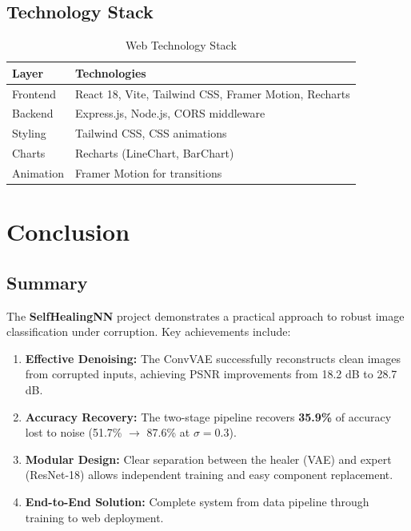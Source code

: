 \documentclass[11pt,a4paper]{article}
\begin{document}
\subsection{Technology Stack}

\begin{table}[H]
    \centering
    \caption{Web Technology Stack}
    \label{tab:web-tech}
    \begin{tabular}{ll}
        \toprule
        \textbf{Layer} & \textbf{Technologies} \\
        \midrule
        Frontend & React 18, Vite, Tailwind CSS, Framer Motion, Recharts \\
        Backend & Express.js, Node.js, CORS middleware \\
        Styling & Tailwind CSS, CSS animations \\
        Charts & Recharts (LineChart, BarChart) \\
        Animation & Framer Motion for transitions \\
        \bottomrule
    \end{tabular}
\end{table}


\newpage
\section{Conclusion}
\label{sec:conclusion}

\subsection{Summary}

The \textbf{SelfHealingNN} project demonstrates a practical approach to robust image classification under corruption. Key achievements include:

\begin{enumerate}
    \item \textbf{Effective Denoising:} The ConvVAE successfully reconstructs clean images from corrupted inputs, achieving PSNR improvements from 18.2 dB to 28.7 dB.

    \item \textbf{Accuracy Recovery:} The two-stage pipeline recovers \textbf{35.9\%} of accuracy lost to noise (51.7\% $\rightarrow$ 87.6\% at $\sigma=0.3$).

    \item \textbf{Modular Design:} Clear separation between the healer (VAE) and expert (ResNet-18) allows independent training and easy component replacement.

    \item \textbf{End-to-End Solution:} Complete system from data pipeline through training to web deployment.
\end{enumerate}
\end{document}

